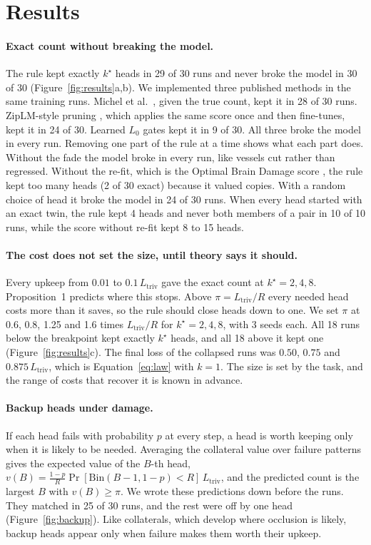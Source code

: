 \documentclass[letterpaper]{article} %
\newcommand{\Ltriv}{L_{\mathrm{triv}}}
\newcommand{\kstar}{k^\star}
\begin{document}
\section{Results}

\paragraph{Exact count without breaking the model.} The rule kept exactly $\kstar$ heads in 29 of 30 runs and never broke the model in 30 of 30 (Figure~\ref{fig:results}a,b). We implemented three published methods in the same training runs. Michel et al.\ \citep{michel2019sixteen}, given the true count, kept it in 28 of 30 runs. ZipLM-style pruning \citep{ziplm}, which applies the same score once and then fine-tunes, kept it in 24 of 30. Learned $L_0$ gates \citep{voita2019analyzing,louizos2018learning} kept it in 9 of 30. All three broke the model in every run. Removing one part of the rule at a time shows what each part does. Without the fade the model broke in every run, like vessels cut rather than regressed. Without the re-fit, which is the Optimal Brain Damage score \citep{obd}, the rule kept too many heads (2 of 30 exact) because it valued copies. With a random choice of head it broke the model in 24 of 30 runs. When every head started with an exact twin, the rule kept 4 heads and never both members of a pair in 10 of 10 runs, while the score without re-fit kept 8 to 15 heads.

\paragraph{The cost does not set the size, until theory says it should.} Every upkeep from $0.01$ to $0.1\,\Ltriv$ gave the exact count at $\kstar=2,4,8$. Proposition~1 predicts where this stops. Above $\pi=\Ltriv/R$ every needed head costs more than it saves, so the rule should close heads down to one. We set $\pi$ at 0.6, 0.8, 1.25 and 1.6 times $\Ltriv/R$ for $\kstar=2,4,8$, with 3 seeds each. All 18 runs below the breakpoint kept exactly $\kstar$ heads, and all 18 above it kept one (Figure~\ref{fig:results}c). The final loss of the collapsed runs was $0.50$, $0.75$ and $0.875\,\Ltriv$, which is Equation~\eqref{eq:law} with $k=1$. The size is set by the task, and the range of costs that recover it is known in advance.

\paragraph{Backup heads under damage.} If each head fails with probability $p$ at every step, a head is worth keeping only when it is likely to be needed. Averaging the collateral value over failure patterns gives the expected value of the $B$-th head, $v(B)=\frac{1-p}{R}\Pr[\mathrm{Bin}(B-1,1-p)<R]\,\Ltriv$, and the predicted count is the largest $B$ with $v(B)\ge\pi$. We wrote these predictions down before the runs. They matched in 25 of 30 runs, and the rest were off by one head (Figure~\ref{fig:backup}). Like collaterals, which develop where occlusion is likely, backup heads appear only when failure makes them worth their upkeep.
\end{document}
